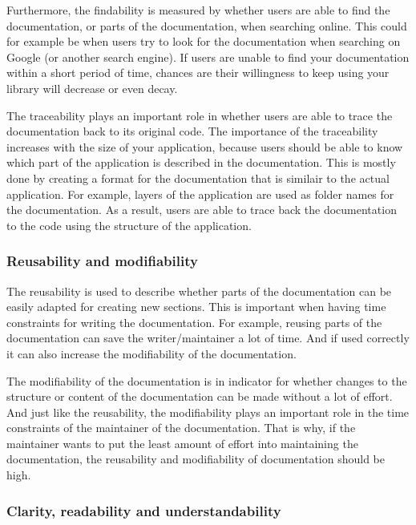 \documentclass{article}
\begin{document}
    Furthermore, the findability is measured by whether users are able to find the documentation, or parts of the documentation, when searching online.
    This could for example be when users try to look for the documentation when searching on Google (or another search engine). If users are unable to
    find your documentation within a short period of time, chances are their willingness to keep using your library will decrease or even decay.\cite{ding}

    The traceability plays an important role in whether users are able to trace the documentation back to its original code. The importance of the traceability
    increases with the size of your application, because users should be able to know which part of the application is described in the documentation.
    This is mostly done by creating a format for the documentation that is similair to the actual application. For example, layers of the application are used
    as folder names for the documentation. As a result, users are able to trace back the documentation to the code using the structure of the application.\cite{jansen}\cite{garousi}

    \subsubsection{Reusability and modifiability}

    The reusability is used to describe whether parts of the documentation can be easily adapted for creating new sections. This is important when having
    time constraints for writing the documentation. For example, reusing parts of the documentation can save the writer/maintainer a lot of time. And if used
    correctly it can also increase the modifiability of the documentation.\cite{ding}

    The modifiability of the documentation is in indicator for whether changes to the structure or content of the documentation can be made without
    a lot of effort. And just like the reusability, the modifiability plays an important role in the time constraints of the maintainer of the documentation.
    That is why, if the maintainer wants to put the least amount of effort into maintaining the documentation, the reusability and modifiability of
    documentation should be high.\cite{ding}

    \subsubsection{Clarity, readability and understandability}
\end{document}
